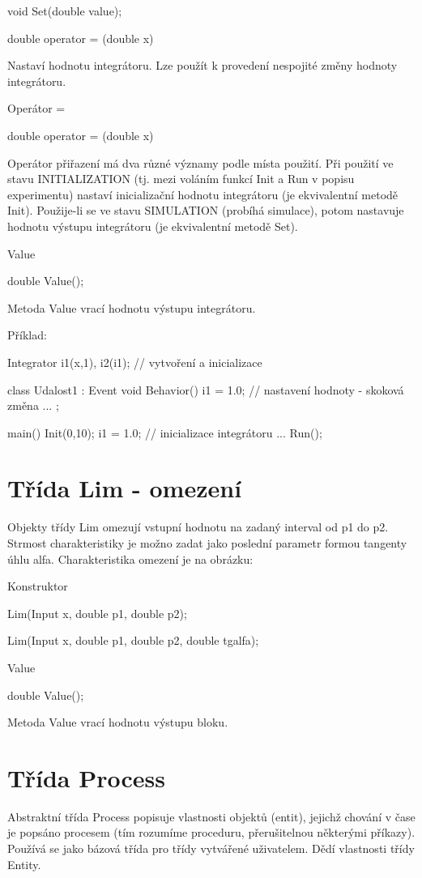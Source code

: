 \documentclass[a4paper]{article}
\begin{document}
  void Set(double value);

  double operator = (double x)


Nastaví hodnotu integrátoru. Lze použít k provedení nespojité změny
hodnoty integrátoru.


Operátor =

  double operator = (double x)


Operátor přiřazení má dva různé významy podle místa použití. Při
použití ve stavu INITIALIZATION (tj. mezi voláním funkcí Init
a Run v popisu experimentu) nastaví inicializační hodnotu
integrátoru (je ekvivalentní metodě Init). Použije-li se
ve stavu SIMULATION (probíhá simulace), potom nastavuje hodnotu výstupu
integrátoru (je ekvivalentní metodě Set).


Value

  double Value();


Metoda Value vrací hodnotu výstupu integrátoru.

Příklad:

Integrator i1(x,1),
           i2(i1);  // vytvoření a inicializace

class Udalost1 : Event {
  void Behavior() {
    i1 = 1.0;       // nastavení hodnoty - skoková změna
    ...
  }
};

main() {
  Init(0,10);
  i1 = 1.0;         // inicializace integrátoru
  ...
  Run();
}


\section{Třída Lim - omezení}

Objekty třídy Lim omezují vstupní hodnotu na zadaný interval
od p1 do p2. Strmost charakteristiky je možno zadat
jako poslední parametr formou tangenty úhlu alfa. Charakteristika
omezení je na obrázku:


Konstruktor

  Lim(Input x, double p1, double p2);

  Lim(Input x, double p1, double p2, double tgalfa);


Value

  double Value();


Metoda Value vrací hodnotu výstupu bloku.

\section{Třída Process}

Abstraktní třída Process popisuje vlastnosti objektů (entit), jejichž
chování v čase je popsáno procesem (tím rozumíme proceduru, přerušitelnou
některými příkazy). Používá se jako bázová třída pro třídy vytvářené
uživatelem. Dědí vlastnosti třídy Entity.
\end{document}
